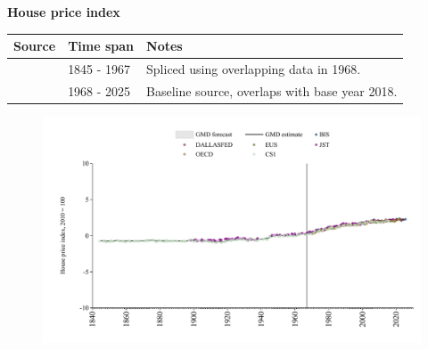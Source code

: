 \documentclass[12pt,a4paper,landscape]{article}
\begin{document}
\begin{adjustbox}{max totalsize={\paperwidth}{\paperheight},center}
\begin{minipage}[t][\textheight][t]{\textwidth}
\vspace*{0.5cm}
{}
\begin{center}
{\Large\bfseries House price index}
\end{center}
\vspace{0.5cm}
\begin{table}[H]
\centering
\small
\begin{tabular}{|l|l|l|}
\hline
\textbf{Source} & \textbf{Time span} & \textbf{Notes} \\
\hline
\rowcolor{white}\cite{CS1_GBR}& 1845 - 1967 &Spliced using overlapping data in 1968. \\
\rowcolor{lightgray}\cite{BIS}& 1968 - 2025 &Baseline source, overlaps with base year 2018. \\
\hline
\end{tabular}
\end{table}
\begin{figure}[H]
\centering
\includegraphics[width=\textwidth,height=0.6\textheight,keepaspectratio]{graphs/GBR_HPI.pdf}
\end{figure}
\end{minipage}
\end{adjustbox}
\end{document}
